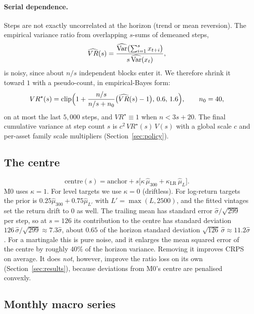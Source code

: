 \paragraph{Serial dependence.} Steps are not exactly uncorrelated at the horizon (trend or mean reversion). The empirical variance ratio from
overlapping $s$-sums of demeaned steps,
\begin{equation}
  \widehat{VR}(s)=\frac{\widehat{\operatorname{Var}}\bigl(\sum_{i=1}^s x_{t+i}\bigr)}{s\,\widehat{\operatorname{Var}}(x_t)},
\end{equation}
is noisy, since about $n/s$ independent blocks enter it. We therefore shrink it toward $1$ with a pseudo-count, in empirical-Bayes form:
\begin{equation}\label{eq:vr}
  VR^\star(s) = \mathrm{clip}\Bigl(1+\frac{n/s}{n/s+n_0}\bigl(\widehat{VR}(s)-1\bigr),\,0.6,\,1.6\Bigr),\qquad n_0=40,
\end{equation}
on at most the last $5{,}000$ steps, and $VR^\star\equiv1$ when $n<3s+20$. The final cumulative variance at step count $s$ is
$c^2\,VR^\star(s)\,V(s)$ with a global scale $c$ and per-asset family scale multipliers (Section~\ref{sec:policy}).

\subsection{The centre}

\begin{equation}
  \text{centre}(s) = \text{anchor} + s\bigl[\kappa\,\hat\mu_{300} + \kappa_{\mathrm{LR}}\,\hat\mu_{L}\bigr].
\end{equation}
M0 uses $\kappa=1$. For level targets we use $\kappa=0$ (driftless). For log-return targets the prior is $0.25\hat\mu_{300}+0.75\hat\mu_{L'}$ with
$L'=\max(L,2500)$, and the fitted vintages set the return drift to $0$ as well. The trailing mean has standard error
$\hat\sigma/\sqrt{299}$ per step, so at $s=126$ its contribution to the centre has standard deviation $126\,\hat\sigma/\sqrt{299}\approx7.3\hat\sigma$,
about $0.65$ of the horizon standard deviation $\sqrt{126}\,\hat\sigma\approx11.2\hat\sigma$. For a martingale this is pure noise, and it
enlarges the mean squared error of the centre by roughly $40\%$ of the horizon variance. Removing it improves CRPS on average. It does \emph{not}, however, improve the
ratio loss on its own (Section~\ref{sec:results}), because deviations from M0's centre are penalised convexly.

\subsection{Monthly macro series}

